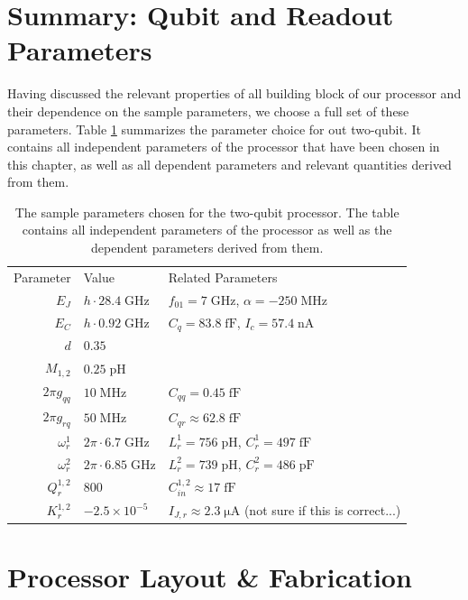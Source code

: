 \section{Summary: Qubit and Readout Parameters}

Having discussed the relevant properties of all building block of our processor and their dependence on the sample parameters, we choose a full set of these parameters. Table \ref{table:processor_parameters} summarizes the parameter choice for out two-qubit. It contains all independent parameters of the processor that have been chosen in this chapter, as well as all dependent parameters and relevant quantities derived from them.

\begin{table}
	\centering
	\begin{tabularx}{\textwidth}{r|X|l}
	Parameter & Value & Related Parameters \\ [0.3cm]
	$E_J$ & $h\cdot 28.4\;\mathrm{GHz}$ & $f_{01}=7\;\mathrm{GHz}$, $\alpha=-250\;\mathrm{MHz}$ \\ [0.3cm]
	$E_C$ & $h\cdot 0.92\;\mathrm{GHz}$ & $C_q = 83.8\;\mathrm{fF}$, $I_c = 57.4 \;\mathrm{nA}$\\ [0.3cm]
	$d$ & $0.35$ & \\ [0.3cm]
	$M_{1,2}$ & $0.25\;\mathrm{pH}$ & \\ [0.3cm]
	$2\pi g_{qq}$  & $10\;\mathrm{MHz}$ & $C_{qq}=0.45\;\mathrm{fF}$ \\ [0.3cm]
	$2\pi g_{rq}$  & $50\;\mathrm{MHz}$ & $C_{qr}\approx 62.8 \;\mathrm{fF}$ \\ [0.3cm]
	$\omega_r^{1}$ & $2\pi\cdot 6.7\;\mathrm{GHz}$ & $L_r^1 = 756\;\mathrm{pH}$, $C_r^1= 497 \;\mathrm{fF}$ \\ [0.3cm]
	$\omega_r^{2}$ & $2\pi\cdot 6.85\;\mathrm{GHz}$ & $L_r^2 = 739\;\mathrm{pH}$, $C_r^2= 486 \;\mathrm{pF}$\\ [0.3cm]
	$Q_r^{1,2}$ & $800$ & $C_{in}^{1,2}\approx 17 \;\mathrm{fF}$ \\ [0.3cm]
	$K_r^{1,2}$ & $-2.5\times 10^{-5}$ & $I_{J,r}\approx 2.3 \;\mathrm{\mu A}$ (not sure if this is correct...) \\ [0.3cm] 
	\end{tabularx}
	\caption[]{The sample parameters chosen for the two-qubit processor. The table contains all independent parameters of the processor as well as the dependent parameters derived from them.}
	\label{table:processor_parameters}
\end{table}

\section{Processor Layout \& Fabrication}

